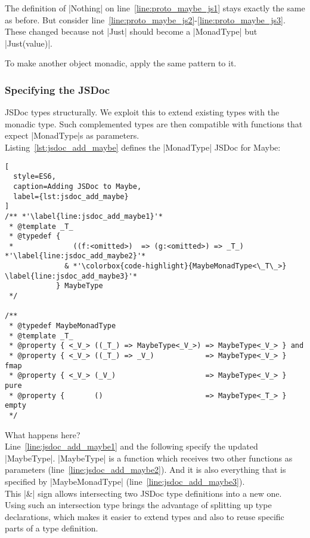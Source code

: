 The definition of |Nothing| on line~\ref{line:proto_maybe_js1} stays exactly
the same as before. But consider
line~\ref{line:proto_maybe_js2}-\ref{line:proto_maybe_js3}. These changed
because not |Just| should become a |MonadType| but |Just(value)|.

To make another object monadic, apply the same pattern to it.

\subsubsection{Specifying the JSDoc} %
\label{subsub:Specify the JSDoc}
JSDoc types structurally. We exploit this to extend existing types with
the monadic type. Such complemented types are then compatible with functions
that expect |MonadType|s as parameters. \\ 
Listing~\ref{lst:jsdoc_add_maybe} defines the |MonadType| JSDoc for Maybe:

\begin{lstlisting}[
  style=ES6,
  caption=Adding JSDoc to Maybe,
  label={lst:jsdoc_add_maybe}
]
/** *'\label{line:jsdoc_add_maybe1}'*
 * @template _T_
 * @typedef { 
 *              ((f:<omitted>)  => (g:<omitted>) => _T_) *'\label{line:jsdoc_add_maybe2}'*
              & *'\colorbox{code-highlight}{MaybeMonadType<\_T\_>} \label{line:jsdoc_add_maybe3}'*
            } MaybeType
 */

/** 
 * @typedef MaybeMonadType
 * @template _T_
 * @property { <_V_> ((_T_) => MaybeType<_V_>) => MaybeType<_V_> } and
 * @property { <_V_> ((_T_) => _V_)            => MaybeType<_V_> } fmap
 * @property { <_V_> (_V_)                     => MaybeType<_V_> } pure
 * @property {       ()                        => MaybeType<_T_> } empty
 */
\end{lstlisting}

What happens here? \\ 
Line~\ref{line:jsdoc_add_maybe1} and the following specify the updated |MaybeType|.
|MaybeType| is a function which receives two other functions as parameters
(line~\ref{line:jsdoc_add_maybe2}). And it is also everything that is specified by
|MaybeMonadType| (line~\ref{line:jsdoc_add_maybe3}). \\
This |&| sign allows intersecting two JSDoc type definitions into a new one.\\

Using such an intersection type brings the advantage of splitting up type
declarations, which makes it easier to extend types and also to reuse specific
parts of a type definition.

